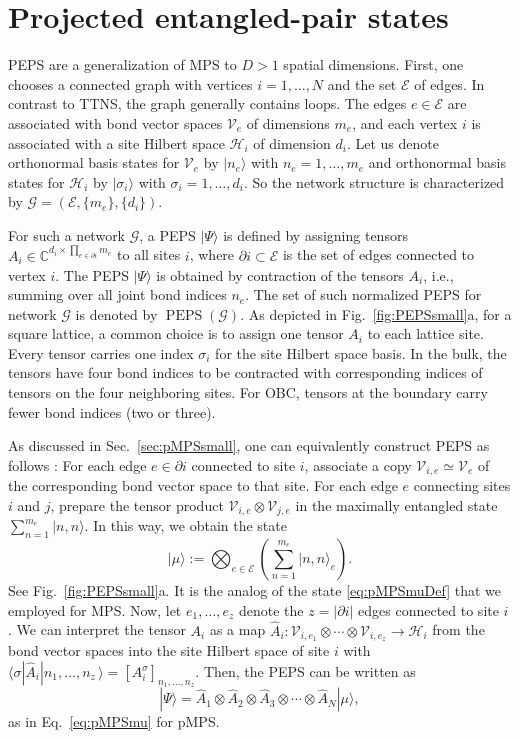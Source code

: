 \documentclass[english,11pt,aps,pra,onecolumn,tightenlines,groupedaddress,superscriptaddress,notitlepage,floatfix,fleqn]{revtex4-1}
\newcommand{\bra}{\langle}
\newcommand{\ket}{\rangle}
\newcommand{\hA}{\hat{A}}
\newcommand{\CC}{\mathbb{C}}
\newcommand{\mc}[1]{\mathcal{#1}}
\renewcommand{\H}{\mc{H}}
\newcommand{\V}{\mc{V}}
\newcommand{\E}{\mc{E}}
\newcommand{\G}{\mc{G}}
\newcommand{\PEPS}{\operatorname{PEPS}}
\begin{document}
\section{Projected entangled-pair states}\label{sec:PEPS}
PEPS \cite{Niggemann1997-104,Nishino2000-575,Martin-Delgado2001-64,Verstraete2004-7,Verstraete2006-96} are a generalization of MPS to $D>1$ spatial dimensions. First, one chooses a connected graph with vertices $i=1,\dots,N$ and the set $\E$ of edges. In contrast to TTNS, the graph generally contains loops. The edges $e\in\E$ are associated with bond vector spaces $\V_e$ of dimensions $m_e$, and each vertex $i$ is associated with a site Hilbert space $\H_i$ of dimension $d_i$. Let us denote orthonormal basis states for $\V_e$ by $|n_e\ket$ with $n_e=1,\dots,m_e$ and orthonormal basis states for $\H_i$ by $|\sigma_i\ket$ with $\sigma_i=1,\dotsc,d_i$.
So the network structure is characterized by $\G=(\E,\{m_e\},\{d_i\})$.

For such a network $\G$, a PEPS $|\Psi\ket$ is defined by assigning tensors $A_i\in\CC^{d_i\times \prod_{e\in\partial i}m_e}$ to all sites $i$, where $\partial i\subset\E$ is the set of edges connected to vertex $i$. The PEPS $|\Psi\ket$ is obtained by contraction of the tensors $A_i$, i.e., summing over all joint bond indices $n_e$. The set of such normalized PEPS for network $\G$ is denoted by $\PEPS(\G)$.
As depicted in Fig.~\ref{fig:PEPSsmall}a, for a square lattice, a common choice is to assign one tensor $A_i$ to each lattice site. Every tensor carries one index $\sigma_i$ for the site Hilbert space basis. In the bulk, the tensors have four bond indices to be contracted with corresponding indices of tensors on the four neighboring sites. For OBC, tensors at the boundary carry fewer bond indices (two or three).

As discussed in Sec.~\ref{sec:pMPSsmall}, one can equivalently construct PEPS as follows \cite{Affleck1988-115,Verstraete2004-7}: For each edge $e\in\partial i$ connected to site $i$, associate a copy $\V_{i,e}\simeq \V_e$ of the corresponding bond vector space to that site. For each edge $e$ connecting sites $i$ and $j$, prepare the tensor product $\V_{i,e}\otimes\V_{j,e}$ in the maximally entangled state $\sum_{n=1}^{m_e} |n, n\ket$. In this way, we obtain the state
\begin{equation}\label{eq:PEPSmuDef}\textstyle
	|\mu\ket:=\bigotimes_{e\in\E}\left(\sum_{n=1}^{m_e} |n, n\ket_e\right).
\end{equation}
See Fig.~\ref{fig:PEPSsmall}a. It is the analog of the state \eqref{eq:pMPSmuDef} that we employed for MPS. Now, let $e_1,\dotsc,e_z$ denote the $z=|\partial i|$ edges connected to site $i$. We can interpret the tensor $A_i$ as a map $\hA_i:\V_{i,e_1}\otimes\dotsb\otimes \V_{i,e_z}\to \H_i$ from the bond vector spaces into the site Hilbert space of site $i$ with $\bra \sigma|\hat{A}_i|n_{1},\dotsc,n_{z}\,\ket=[A_i^{\sigma}]_{n_{1},\dotsc,n_{z}}$. Then, the PEPS can be written as
\begin{equation}\label{eq:PEPSmu}
	|\Psi\ket=\hat{A}_1\otimes\hat{A}_2\otimes\hat{A}_3\otimes\dotsb\otimes\hat{A}_N|\mu\ket,
\end{equation}
as in Eq.~\eqref{eq:pMPSmu} for pMPS.
\end{document}

